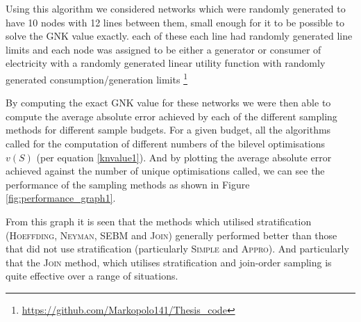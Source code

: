 \DIFaddend Using this algorithm we considered networks which were randomly generated to have 10 nodes with 12 lines between them, \DIFdelbegin {}\DIFdelend \DIFaddbegin {}\DIFaddend small enough for it to be possible to solve the GNK value exactly.
\DIFdelbegin {}\DIFdelend \DIFaddbegin {}\DIFaddend each of these \DIFdelbegin {}\DIFdelend \DIFaddbegin {}\DIFaddend each line had randomly generated line limits \DIFaddbegin {}\DIFaddend and each node was \DIFaddbegin {}\DIFaddend assigned to be either a generator or consumer of electricity \DIFdelbegin {}\DIFdelend \DIFaddbegin {}\DIFaddend with a randomly generated linear utility function \DIFaddbegin {}\DIFaddend with randomly generated consumption/generation limits \DIFdelbegin {}\DIFdelend \DIFaddbegin {}\footnote{\href{https://github.com/Markopolo141/Thesis\_code}{https://github.com/Markopolo141/Thesis\_code}}
\DIFaddend 

By computing the exact GNK value for these networks we were then able to compute the average absolute error achieved by each of the different sampling methods for different sample budgets.
For a given budget, all the algorithms called for the computation of different numbers of the bilevel optimisations $v(S)$ (per equation \ref{knvalue1}).
And by plotting the average absolute error achieved against the number of unique optimisations called, we can see the performance of the sampling methods as shown in Figure \ref{fig:performance_graph1}.

From this graph it is seen that the methods which utilised stratification (\textsc{Hoeffding}, \textsc{Neyman}, \textsc{SEBM} and \textsc{Join})  generally performed better than those that did not use stratification (particularly \textsc{Simple} and \textsc{Appro}).
And particularly that the \textsc{Join} method, which utilises stratification and join-order sampling is quite effective over a range of situations.

